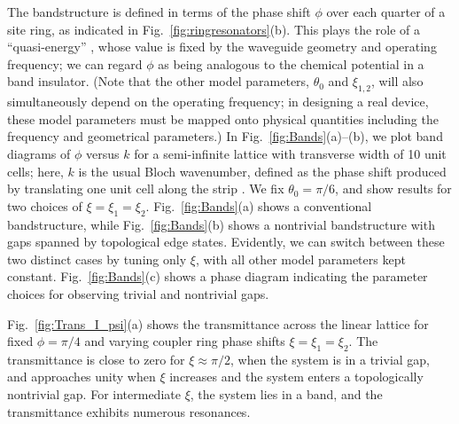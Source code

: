 \documentclass[aps,prx,twocolumn,superscriptaddress]{revtex4-1}
\begin{document}
The bandstructure is defined in terms of the phase shift $\phi$ over each quarter of a site ring, as indicated in Fig.~\ref{fig:ringresonators}(b).  This plays the role of a ``quasi-energy'' \cite{liang2013,Pasek2014}, whose value is fixed by the waveguide geometry and operating frequency; we can regard $\phi$ as being analogous to the chemical potential in a band insulator.  (Note that the other model parameters, $\theta_0$ and $\xi_{1,2}$, will also simultaneously depend on the operating frequency; in designing a real device, these model parameters must be mapped onto physical quantities including the frequency and geometrical parameters.)  In Fig.~\ref{fig:Bands}(a)--(b), we plot band diagrams of $\phi$ versus $k$ for a semi-infinite lattice with transverse width of 10 unit cells; here, $k$ is the usual Bloch wavenumber, defined as the phase shift produced by translating one unit cell along the strip \cite{liang2013}.  We fix $\theta_0=\pi/6$, and show results for two choices of $\xi = \xi_1 = \xi_2$.  Fig.~\ref{fig:Bands}(a) shows a conventional bandstructure, while Fig.~\ref{fig:Bands}(b) shows a nontrivial bandstructure with gaps spanned by topological edge states.  Evidently, we can switch between these two distinct cases by tuning only $\xi$, with all other model parameters kept constant.  Fig.~\ref{fig:Bands}(c) shows a phase diagram indicating the parameter choices for observing trivial and nontrivial gaps.

Fig.~\ref{fig:Trans_I_psi}(a) shows the transmittance across the linear lattice for fixed $\phi = \pi/4$ and varying coupler ring phase shifts $\xi = \xi_1 = \xi_2$.  The transmittance is close to zero for $\xi \approx \pi/2$, when the system is in a trivial gap, and approaches unity when $\xi$ increases and the system enters a topologically nontrivial gap.  For intermediate $\xi$, the system lies in a band, and the transmittance exhibits numerous resonances.
\end{document}
